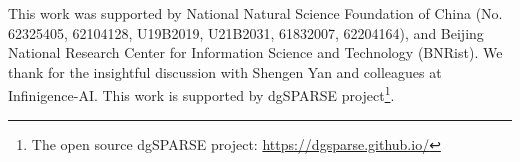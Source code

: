 \documentclass[sigconf]{acmart}
\begin{document}
\vspace{-5pt}
\begin{acks}
This work was supported by National Natural Science Foundation of China (No. 62325405, 62104128, U19B2019, U21B2031, 61832007, 62204164), and Beijing National Research Center for Information Science and Technology (BNRist). We thank for the insightful discussion with Shengen Yan and colleagues at Infinigence-AI. This work is supported by dgSPARSE project\footnote{The open source dgSPARSE project: \url{https://dgsparse.github.io/}}.
\end{acks}


\balance











\end{document}
